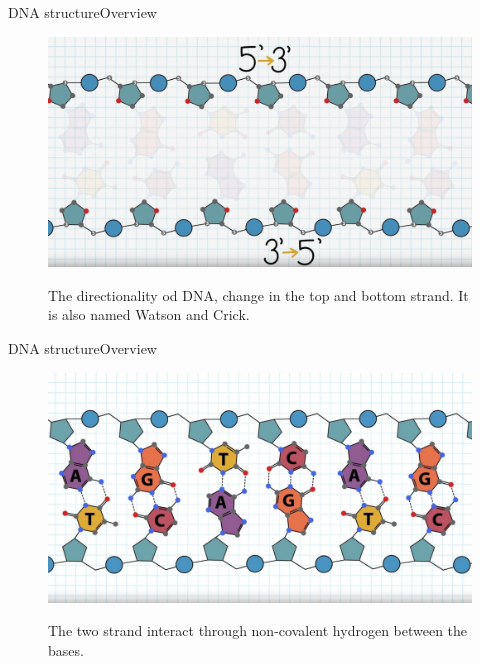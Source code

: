 \documentclass[10pt]{beamer}
\begin{document}
{%
\begin{frame}{DNA structure}{Overview}
	\begin{figure}[]
		\centering
		\includegraphics[width=\textwidth,height=0.7\textheight,keepaspectratio]{img/introduction/dna17.jpg}
		\label{img:mot2}
		\caption{The directionality od DNA, change in the top and bottom strand. It is also named Watson and Crick. }
	\end{figure}
\end{frame}

\begin{frame}{DNA structure}{Overview}
	\begin{figure}[]
		\centering
		\includegraphics[width=\textwidth,height=0.7\textheight,keepaspectratio]{img/introduction/dna18.jpg}
		\label{img:mot2}
		\caption{The two strand interact through non-covalent hydrogen between the bases.}
	\end{figure}
\end{frame}

}
\end{document}
